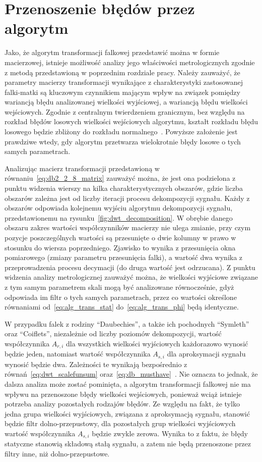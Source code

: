 \section{Przenoszenie błędów przez algorytm}

Jako, że algorytm transformacji falkowej przedstawić można w formie macierzowej, istnieje możliwość analizy jego właściwości metrologicznych zgodnie z metodą przedstawioną w poprzednim rozdziale pracy. Należy zauważyć, że parametry macierzy transformacji wynikające z charakterystyki zastosowanej falki-matki są kluczowym czynnikiem mającym wpływ na związek pomiędzy wariancją błędu analizowanej wielkości wyjściowej, a wariancją błędu wielkości wejściowych. Zgodnie z centralnym twierdzeniem granicznym, bez względu na rozkład błędów losowych wielkości wejściowych algorytmu, kształt rozkładu błędu losowego będzie zbliżony do rozkładu normalnego~\cite{jcgm_guide}. Powyższe założenie jest prawdziwe wtedy, gdy algorytm przetwarza wielokrotnie błędy losowe o tych samych parametrach.

Analizując macierz transformacji przedstawioną w równaniu~\eqref{eq:db2_2_8_matrix} zauważyć można, że jest ona podzielona z punktu widzenia wierszy na kilka charakterystycznych obszarów, gdzie liczba obszarów zależna jest od liczby iteracji procesu dekompozycji sygnału. Każdy z obszarów odpowiada kolejnemu wyjściu algorytmu dekompozycji sygnału, przedstawionemu na rysunku~\ref{fig:dwt_decomposition}. W obrębie danego obszaru zakres wartości współczynników macierzy nie ulega zmianie, przy czym pozycje poszczególnych wartości są przesunięte o dwie kolumny w prawo w stosunku do wiersza poprzedniego. Zjawisko to wynika z przesunięcia okna pomiarowego (zmiany parametru przesunięcia falki), a wartość dwa wynika z przeprowadzenia procesu decymacji (do druga wartość jest odrzucana). Z punktu widzenia analizy metrologicznej zauważyć można, że wielkości wyjściowe związane z tym samym parametrem skali mogą być analizowane równocześnie, gdyż odpowiada im filtr o tych samych parametrach, przez co wartości określone równaniami od~\eqref{eq:alg_trans_stat} do~\eqref{eq:alg_trans_phi} będą identyczne.

W przypadku falek z rodziny \enquote{Daubechies}, a także ich pochodnych \enquote{Symleth} oraz \enquote{Coiflets}, niezależnie od liczby poziomów dekompozycji, wartość współczynnika $A_{r,i}$ dla wszystkich wielkości wyjściowych każdorazowo wynosić będzie jeden, natomiast wartość współczynnika $A_{s,i}$ dla aproksymacji sygnału wynosić będzie dwa. Zależności te wynikają bezpośrednio z równań~\eqref{eq:dwt_scalefunsum} oraz~\eqref{eq:db_musthave}~\cite{vonesch_dbbasics, wei_coiflet}. Nie oznacza to jednak, że dalsza analiza może zostać pominięta, a algorytm transformacji falkowej nie ma wpływu na przenoszone błędy wielkości wejściowych, ponieważ wciąż istnieje potrzeba analizy pozostałych rodzajów błędów. Ze względu na fakt, że tylko jedna grupa wielkości wyjściowych, związana z aproksymacją sygnału, stanowić będzie filtr dolno-przepustowy, dla pozostałych grup wielkości wyjściowych wartość współczynnika $A_{s,i}$ będzie zwykle zerowa. Wynika to z faktu, że błędy statyczne stanowią składową stałą sygnału, a zatem nie będą przenoszone przez filtry inne, niż dolno-przepustowe.

